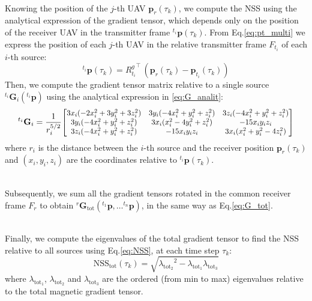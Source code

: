 \documentclass[main]{subfiles}
\begin{document}
\noindent\\
Knowing the position of the $j$-th UAV $\mathbf{p}_{r}(\tau_k)$, 
we compute the NSS using the analytical expression of the gradient tensor, which depends
only on the position of the receiver UAV in the transmitter frame
${}^{t_i} \mathbf{p}(\tau_k)$.
From Eq.\ref{eq:pt_multi} we express the position of each $j$-th UAV
in the relative transmitter frame $F_{t_i}$ of each $i$-th source:
\begin{equation}
    {}^{t_i} \mathbf{p}(\tau_k) = {R^g_{t_i}}^\top \, \left( \mathbf{p}_{r}(\tau_k) - \mathbf{p}_{t_i}(\tau_k) \right)
\end{equation}
Then, we compute the gradient tensor matrix relative to a single source 
${}^{t_i} \mathbf{G}_i({}^{t_i} \mathbf{p})$ using the analytical expression in \ref{eq:G_analit}:
\begin{equation}
    {}^{t_i} \mathbf{G}_i = \frac{1}{r_i^{5/2}}
    \scalebox{0.90}{$
    \begin{bmatrix}
    3 x_i (-2 x_i^2 + 3y_i^2 + 3z_i^2) & 3 y_i (-4 x_i^2 + y_i^2 + z_i^2) & 3 z_i (-4x_i^2 + y_i^2 + z_i^2) \\
    3 y_i (-4 x_i^2 + y_i^2 + z_i^2) & 3 x_i (x_i^2 - 4 y_i^2 + z_i^2) & -15 x_i y_i z_i \\
    3 z_i (-4 x_i^2 + y_i^2 + z_i^2) & -15 x_i y_i z_i & 3 x_i (x_i^2 + y_i^2 - 4 z_i^2)
    \end{bmatrix}
    $}
\end{equation}
where $r_i$ is the distance between the $i$-th source and the receiver position 
$\mathbf{p}_{r}(\tau_k)$ and  $(x_i, y_i, z_i)$ are the coordinates 
relative to ${}^{t_i} \mathbf{p}(\tau_k)$.

\noindent\\
Subsequently, we sum all the gradient tensors rotated in the common receiver frame $F_{r}$
to obtain ${}^{r} \mathbf{G}_{\text{tot}} ({}^{t_1} \mathbf{p}, \dots {}^{t_n} \mathbf{p})$, in the same way as Eq.\ref{eq:G_tot}.

\noindent\\
Finally, we compute the eigenvalues of the total gradient 
tensor to find the NSS relative to all sources using Eq.\ref{eq:NSS},
 at each time step \( \tau_k \):
\begin{equation}
    \text{NSS}_\text{tot}(\tau_k) = \sqrt{{\lambda_{\text{tot}_2}}^2 - \lambda_{\text{tot}_1} \lambda_{\text{tot}_3}}
    \label{eq:NSS_multi_final}
\end{equation}
where $\lambda_{\text{tot}_1}$, $\lambda_{\text{tot}_2}$ and $\lambda_{\text{tot}_3}$
are the ordered (from min to max) eigenvalues relative to the total magnetic gradient tensor.
\end{document}
